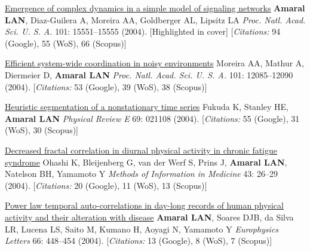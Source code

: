 \NumberedItem{\makebox[0.8cm][r]{[55]}}
\href{/people/amaral/emergence-of-complex-dynamics-in-a-simple-model-of-signaling-networks}
{Emergence of complex dynamics in a simple model of signaling networks}
\newline
{\textbf{Amaral LAN}}, Diaz-Guilera A, Moreira AA, Goldberger AL, Lipsitz LA
\newline
\textit{Proc. Natl. Acad. Sci. U. S. A.}
    101:
15551--15555 (2004).
    [Highlighted in cover]
    [{\em{Citations:}} 94 (Google), 55 (WoS), 66 (Scopus)]
\newline
\Gap
~
\Gap

\NumberedItem{\makebox[0.8cm][r]{[54]}}
\href{/people/amaral/efficient-system-wide-coordination-in-noisy-environments}
{Efficient system-wide coordination in noisy environments}
\newline
Moreira AA, Mathur A, Diermeier D, {\textbf{Amaral LAN}}
\newline
\textit{Proc. Natl. Acad. Sci. U. S. A.}
    101:
12085--12090 (2004).
    [{\em{Citations:}} 53 (Google), 39 (WoS), 38 (Scopus)]
\newline
\Gap
~
\Gap

\NumberedItem{\makebox[0.8cm][r]{[53]}}
\href{/people/amaral/heuristic-segmentation-of-a-nonstationary-time-series}
{Heuristic segmentation of a nonstationary time series}
\newline
Fukuda K, Stanley HE, {\textbf{Amaral LAN}}
\newline
\textit{Physical Review E}
    69:
021108 (2004).
    [{\em{Citations:}} 55 (Google), 31 (WoS), 30 (Scopus)]
\newline
\Gap
~
\Gap

\NumberedItem{\makebox[0.8cm][r]{[52]}}
\href{/people/amaral/decreased-fractal-correlation-in-diurnal-physical-activity-in-chronic-fatigue-syndrome}
{Decreased fractal correlation in diurnal physical activity in chronic fatigue syndrome}
\newline
Ohashi K, Bleijenberg G, van der Werf S, Prins J, {\textbf{Amaral LAN}}, Natelson BH, Yamamoto Y
\newline
\textit{Methods of Information in Medicine }
    43:
26--29 (2004).
    [{\em{Citations:}} 20 (Google), 11 (WoS), 13 (Scopus)]
\newline
\Gap
~
\Gap

\NumberedItem{\makebox[0.8cm][r]{[51]}}
\href{/people/amaral/power-law-temporal-auto-correlations-in-day-long-records-of-human-physical-activity-and-their-alteration-with-disease}
{Power law temporal auto-correlations in day-long records of human physical activity and their alteration with disease}
\newline
{\textbf{Amaral LAN}}, Soares DJB, da Silva LR, Lucena LS, Saito M, Kumano H, Aoyagi N, Yamamoto Y
\newline
\textit{Europhysics Letters}
    66:
448--454 (2004).
    [{\em{Citations:}} 13 (Google), 8 (WoS), 7 (Scopus)]
\newline
\Gap
~
\Gap

